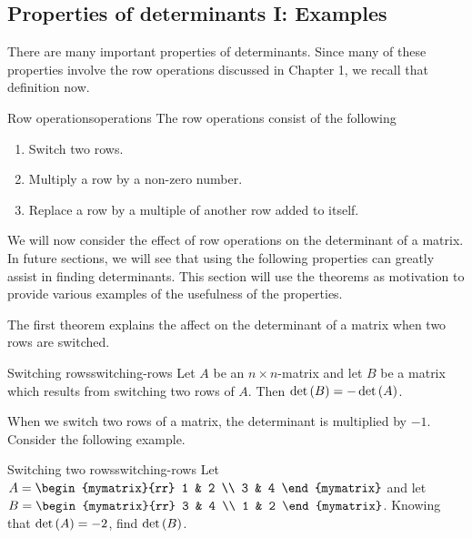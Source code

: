\subsection{Properties of determinants I: Examples}

There are many important properties of determinants. Since many of these properties involve
the row operations discussed in Chapter 1, we recall that definition now. 

\begin{definition}{Row operations}{operations}
The row operations
consist of the following

\begin{enumerate}
\item Switch two rows.

\item Multiply a row by a non-zero number.

\item Replace a row by a multiple of another row added to itself.
\end{enumerate}
\end{definition}

We will now consider the effect of row operations on the determinant of a matrix. In future sections, we will see that using the following properties can 
greatly assist in finding determinants. This section will use the theorems as motivation to provide various examples of the usefulness of the properties. 

The first theorem explains the affect on the determinant of a matrix when two rows are switched. 

\begin{theorem}{Switching rows}{switching-rows}
Let $A$ be an $n\times n$-matrix and let $B$ be a matrix
which results from switching two rows of $A$. Then $\det \left(B\right)
= - \det \left(A\right)$. 
\end{theorem}

When we switch two rows of a matrix, the determinant is multiplied by $-1$. Consider the following example.

\begin{example}{Switching two rows}{switching-rows}
Let $A=\begin{mymatrix}{rr}
1 & 2 \\
3 & 4
\end{mymatrix} $ and let $B=\begin{mymatrix}{rr}
3 & 4 \\
1 & 2
\end{mymatrix}$. 
Knowing that $\det \left(A \right) =-2$, find $\det \left(B\right)$.
\end{example}

